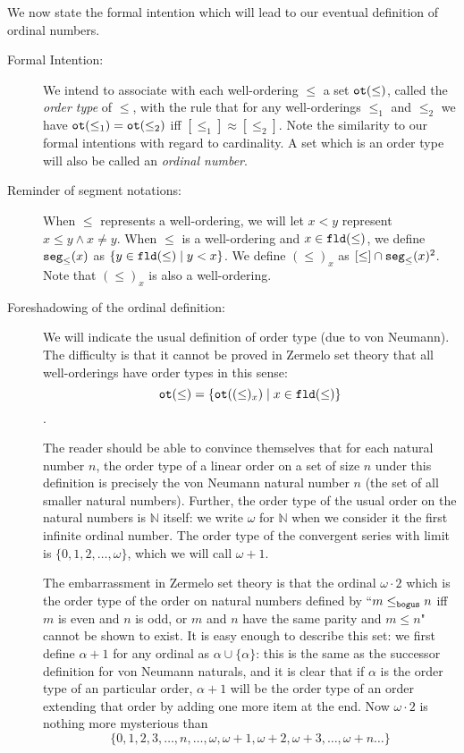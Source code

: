 \documentclass[12pt]{book}
\begin{document}
We now state the formal intention which will lead to our eventual definition of ordinal numbers.

\begin{description}

\item[Formal Intention:]  We intend to associate with each well-ordering $\leq$ a set ${\tt ot}(\leq)$, called the {\em order type\/} of $\leq$, with the rule that for any well-orderings $\leq_1$ and $\leq_2$ we have ${\tt ot}(\leq_1) = {\tt ot}(\leq_2)$ iff $[\leq_1] \approx [\leq_2]$.  Note the similarity to our formal intentions with regard to cardinality.  A set which is an order type will also be called an {\em ordinal number\/}.

\item[Reminder of segment notations:]  When $\leq$ represents a well-ordering, we will let $x < y$ represent $x \leq y \wedge x \neq y$.  When $\leq$ is a well-ordering and $x \in {\tt fld}(\leq)$, we define ${\tt seg}_{\leq}(x)$ as
$\{y \in {\tt fld}(\leq)\mid y < x\}$.  We define $(\leq)_x$ as $[\leq] \cap {\tt seg}_{\leq}(x)^2$.  Note that $(\leq)_x$ is also a well-ordering.

\item[Foreshadowing of the ordinal definition:]  We will indicate the usual definition of order type (due to von Neumann).  The difficulty is that it cannot be proved in Zermelo set theory that all well-orderings have order types in this sense:  $${\tt ot}(\leq) = \{{\tt ot}((\leq)_x)\mid x \in {\tt fld}(\leq)\}$$.

The reader should be able to convince themselves that for each natural number $n$, the order type of a linear order on a set of size $n$ under this definition is precisely the von Neumann natural number $n$ (the set of all smaller natural numbers).  Further, the order type of the usual order on the natural numbers is $\mathbb N$ itself:  we write $\omega$ for $\mathbb N$ when we consider it the first infinite ordinal number.  The order type
of the convergent series with limit is $\{0,1,2,\ldots,\omega\}$, which we will call $\omega+1$.

The embarrassment in Zermelo set theory is that the ordinal $\omega \cdot 2$ which is the order type of the order on natural numbers defined by
``$m \leq_{\tt bogus} n$ iff $m$ is even and $n$ is odd, or $m$ and $n$ have the same parity and $m \leq n$" cannot be shown to exist.  It is easy enough to describe this set:  we first define $\alpha+1$ for any ordinal as $\alpha \cup \{\alpha\}$:  this is the same as the successor definition for von Neumann naturals, and it is clear that if $\alpha$ is the order type of an particular order, $\alpha+1$ will be the order type of an order extending that order by adding one more item at the end.  Now $\omega\cdot 2$ is nothing more mysterious than $$\{0,1,2,3,\ldots,n,\ldots,\omega,\omega+1,\omega+2,\omega+3, \ldots,\omega+n\ldots\}$$

\end{description}
\end{document}
